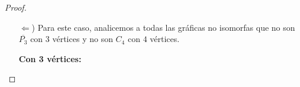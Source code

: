 \documentclass{article}
\begin{document}
\begin{enumerate}
\begin{proof}
\begin{itemize}
\begin{itemize}
            \item[$\cdot\cdot$)] Si $G$ es \textit{escendible completa}, entonces
              $\overline{P_3}$ es subgr\'afica inducida de $G$. 
              Supongamos, sin pérdida de generalidad, que $y_0 \in S$. 
              Entonces: $y_1 \in S$ (pues $y_0 y_1 \notin E_G$).
              Luego, $y_2 \in S$!! (pues $y_1 y_2 \notin E_G$). Pero no todos los $y_i$'s
              pueden estar en $S$. 
              Si $y_0 \in K$, entonces $y_1 \in S$ o $y_1 \in K$ implican que $y_0$ es
              adyacente a $y_1$!! 
              Pero $y_0 y_1 \notin E_G$ y he aqu\'i una contradicci\'on de suponer a
              $\overline{P_3}$
              como subgr\'afica inducida de $G$.
              Por tanto, se concluye que $\overline{P_3}$ no est\'a contenida como
              subgr\'afica inducida en $G$.
          \end{itemize}

        \item[$\Leftarrow$)] Para este caso, analicemos a todas las gr\'aficas no isomorfas
          que no son $\overline{P_3}$ con $3$ v\'ertices y no son $C_4$ con $4$ v\'ertices.

          \textbf{Con 3 v\'ertices:}

          \begin{figure}[ht!]
            \centering
\end{figure}
\end{itemize}
\end{proof}
\end{enumerate}
\end{document}
